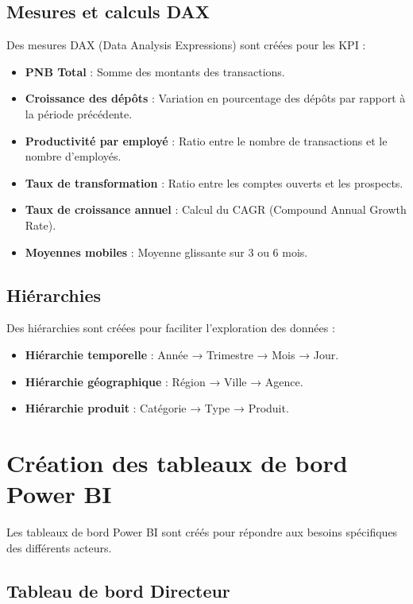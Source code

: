 \subsection{Mesures et calculs DAX}

Des mesures DAX (Data Analysis Expressions) sont créées pour les KPI :

\begin{itemize}
    \item \textbf{PNB Total} : Somme des montants des transactions.
    \item \textbf{Croissance des dépôts} : Variation en pourcentage des dépôts par rapport à la période précédente.
    \item \textbf{Productivité par employé} : Ratio entre le nombre de transactions et le nombre d'employés.
    \item \textbf{Taux de transformation} : Ratio entre les comptes ouverts et les prospects.
    \item \textbf{Taux de croissance annuel} : Calcul du CAGR (Compound Annual Growth Rate).
    \item \textbf{Moyennes mobiles} : Moyenne glissante sur 3 ou 6 mois.
\end{itemize}

\subsection{Hiérarchies}

Des hiérarchies sont créées pour faciliter l'exploration des données :

\begin{itemize}
    \item \textbf{Hiérarchie temporelle} : Année → Trimestre → Mois → Jour.
    \item \textbf{Hiérarchie géographique} : Région → Ville → Agence.
    \item \textbf{Hiérarchie produit} : Catégorie → Type → Produit.
\end{itemize}

\section{Création des tableaux de bord Power BI}
\label{sec:sprint7-dashboards}

Les tableaux de bord Power BI sont créés pour répondre aux besoins spécifiques des différents acteurs.

\subsection{Tableau de bord Directeur}


